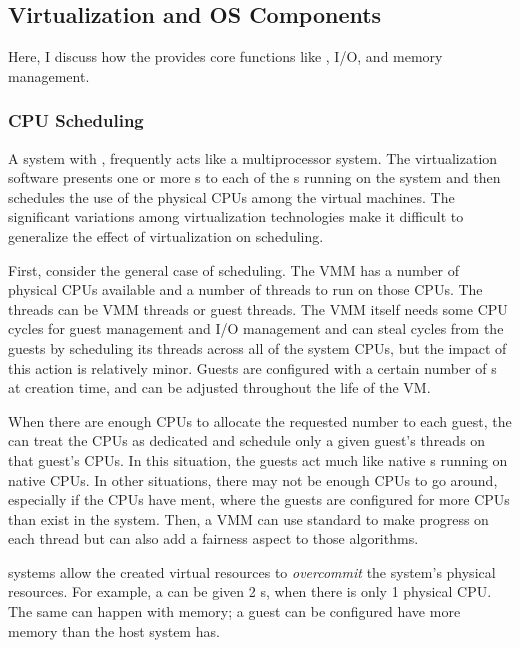 \subsection{Virtualization and OS Components}\label{subsec:Virtualization_OS_Components}
Here, I discuss how the  provides core  functions like , I/O, and memory management.

\subsubsection{CPU Scheduling}\label{subsubsec:VM_CPU_Scheduling}
A system with , frequently acts like a multiprocessor system.
The virtualization software presents one or more s to each of the s running on the system and then schedules the use of the physical CPUs among the virtual machines.
The significant variations among virtualization technologies make it difficult to generalize the effect of virtualization on scheduling.

First, consider the general case of  scheduling.
The VMM has a number of physical CPUs available and a number of threads to run on those CPUs.
The threads can be VMM threads or guest threads.
The VMM itself needs some CPU cycles for guest management and I/O management and can steal cycles from the guests by scheduling its threads across all of the system CPUs, but the impact of this action is relatively minor.
Guests are configured with a certain number of s at creation time, and can be adjusted throughout the life of the VM.\@

When there are enough CPUs to allocate the requested number to each guest, the  can treat the CPUs as dedicated and schedule only a given guest's threads on that guest's CPUs.
In this situation, the guests act much like native s running on native CPUs.
In other situations, there may not be enough CPUs to go around, especially if the CPUs have ment, where the guests are configured for more CPUs than exist in the system.
Then, a VMM can use standard  to make progress on each thread but can also add a fairness aspect to those algorithms.

\begin{definition}[Overcommit]\label{def:Overcommit}
   systems allow the created virtual resources to \emph{overcommit} the system's physical resources.
  For example, a  can be given 2 s, when there is only 1 physical CPU.\@
  The same can happen with memory; a guest can be configured have more memory than the host system has.
\end{definition}

